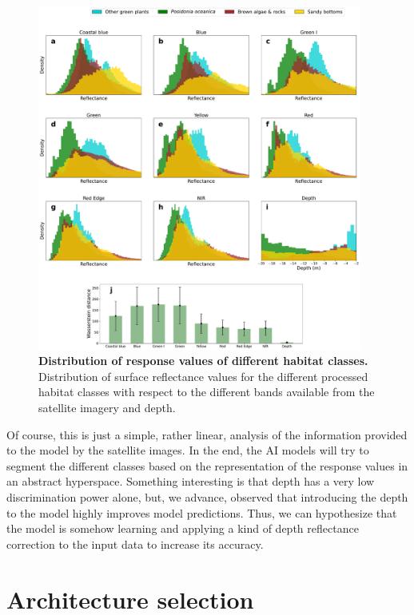\begin{figure}[H]
    \centering

    \includegraphics[width=0.95\textwidth]{Figures/Reflectance_histograms_Mallorca_only.pdf}
    \caption[Distribution of response values of different habitat
        classes]{\textbf{Distribution of response values of different habitat
            classes.} Distribution of surface reflectance values for the
        different processed habitat classes with respect to the different bands
        available from the satellite imagery and depth.}
    \label{fig:reflectance}
\end{figure}

Of course, this is just a simple, rather linear, analysis of the
information provided to the model by the satellite images. In the end, the AI
models will try to segment the different classes based on the representation of
the response values in an abstract hyperspace. Something interesting is that
depth has a very low discrimination power alone, but, we advance, observed that
introducing the depth to the model highly improves model predictions. Thus, we
can hypothesize that the model is somehow learning and applying a kind of depth
reflectance correction to the input data to increase its accuracy.

\section{Architecture selection}\label{app:architecture_selection}

